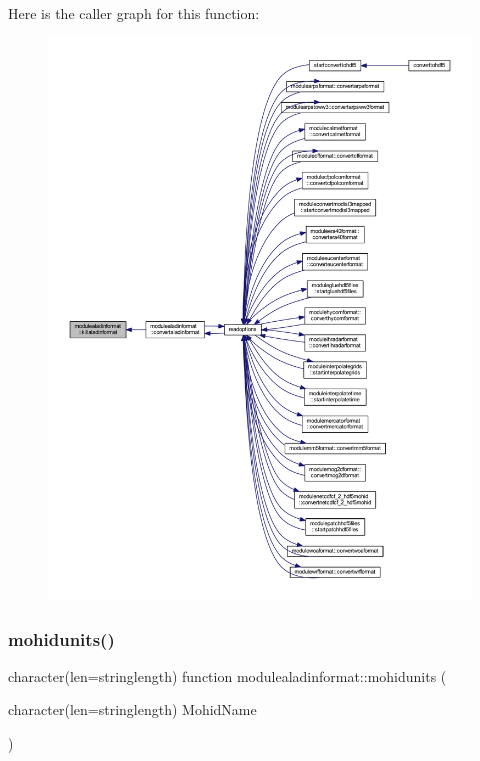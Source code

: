 Here is the caller graph for this function\+:\nopagebreak
\begin{figure}[H]
\begin{center}
\leavevmode
\includegraphics[width=350pt]{namespacemodulealadinformat_a5391156d679edf14a9f2631410182102_icgraph}
\end{center}
\end{figure}
\mbox{\label{namespacemodulealadinformat_a0e28e132a765a53e91eb16cf638b0b32}} 
\subsubsection{\texorpdfstring{mohidunits()}{mohidunits()}}
{\footnotesize\ttfamily character(len=stringlength) function modulealadinformat\+::mohidunits (\begin{DoxyParamCaption}\item[{character(len=stringlength)}]{Mohid\+Name }\end{DoxyParamCaption})\hspace{0.3cm}{\ttfamily [private]}}

